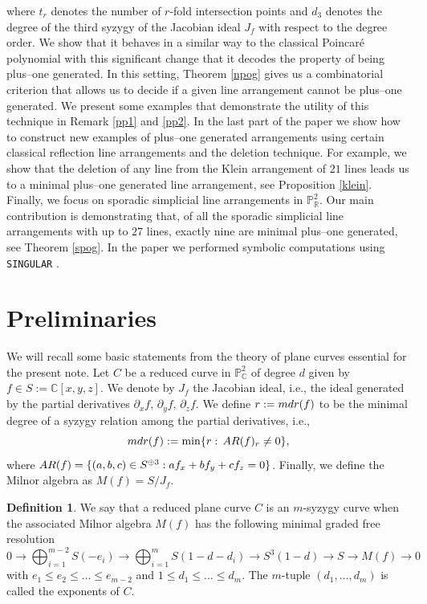 \documentclass[12pt]{article}
\theoremstyle{plain}
\theoremstyle{definition}
\newtheorem{definition}[thm]{Definition}
\begin{document}
where $t_{r}$ denotes the number of $r$-fold intersection points and $d_{3}$ denotes the degree of the third syzygy of the Jacobian ideal $J_f$ with respect to the degree order. We show that it behaves in a similar way to the classical Poincar\'e polynomial with this significant change that it decodes the property of being plus--one generated. In this setting, Theorem \ref{npog} gives us a combinatorial criterion that allows us to decide if a given line arrangement cannot be plus--one generated. We present some examples that demonstrate the utility of this technique in Remark \ref{pp1} and \ref{pp2}. In the last part of the paper we show how to construct new examples of plus--one generated arrangements using certain classical reflection line arrangements and the deletion technique. For example, we show that the deletion of any line from the Klein arrangement of $21$ lines leads us to a minimal plus--one generated line arrangement, see Proposition \ref{klein}. Finally, we focus on sporadic simplicial line arrangements in $\mathbb{P}^{2}_{\mathbb{R}}$. Our main contribution is demonstrating that, of all the sporadic simplicial line arrangements with up to $27$ lines, exactly nine are minimal plus--one generated, see Theorem \ref{spog}. In the paper we performed symbolic computations using \verb}SINGULAR} \cite{Singular}.
\section{Preliminaries}
We will recall some basic statements from the theory of plane curves essential for the present note. Let $C$ be a reduced curve in $\mathbb{P}^{2}_{\mathbb{C}}$ of degree $d$ given by $f \in S :=\mathbb{C}[x,y,z]$. We denote by $J_{f}$ the Jacobian ideal, i.e., the ideal generated by the partial derivatives $\partial_{x}f, \, \partial_{y}f, \, \partial_{z}f$. We define $r:={\rm mdr}(f)$ to be the minimal degree of a syzygy relation among the partial derivatives, i.e., 
$${\rm mdr}(f):=\min\{r : \, {\rm AR}(f)_{r} \neq 0 \},$$
where ${\rm AR}(f) = \{(a,b,c)\in S^{\oplus 3} : af_x+bf_y+cf_z=0\}$.
Finally, we define the Milnor algebra as $M(f) = S / J_{f}$.
\begin{definition}
We say that a reduced plane curve $C$ is an $m$-syzygy curve when the associated Milnor algebra $M(f)$ has the following minimal graded free resolution
$$0 \rightarrow \bigoplus_{i=1}^{m-2}S(-e_{i}) \rightarrow \bigoplus_{i=1}^{m}S(1-d - d_{i}) \rightarrow S^{3}(1-d)\rightarrow S \rightarrow M(f) \rightarrow 0$$
with $e_{1} \leq e_{2} \leq \ldots \leq e_{m-2}$ and $1\leq d_{1} \leq \ldots \leq d_{m}$. The $m$-tuple $(d_{1}, \ldots , d_{m})$ is called the exponents of $C$.
\end{definition}
\end{document}
